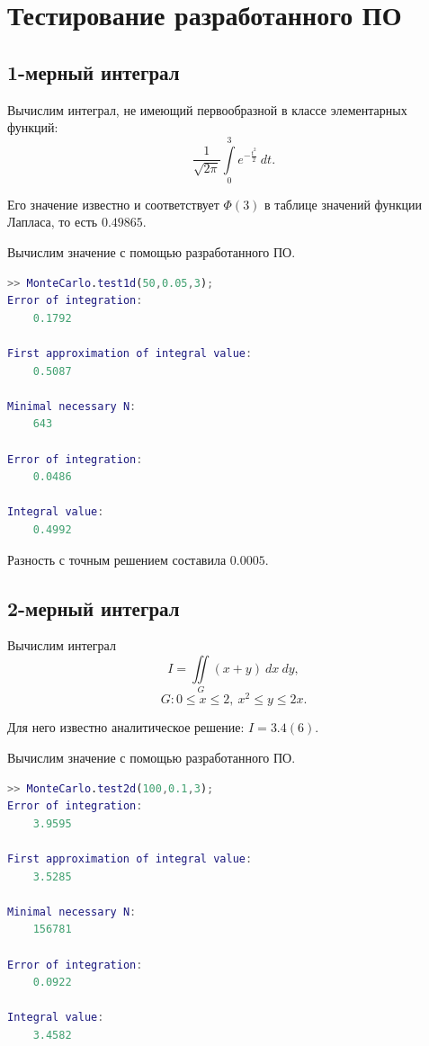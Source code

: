 \documentclass[a4paper,12pt]{article}
\begin{document}
\newpage
\section{Тестирование разработанного ПО}

\subsection{1-мерный интеграл}

Вычислим интеграл, не имеющий первообразной в классе элементарных функций:
\begin{equation}
	\frac{1}{\sqrt{2\pi}} \int\limits_{0}^{3} e^{-\frac{t^2}{2}}\:dt.
\end{equation}

Его значение известно и соответствует $\Phi(3)$ в таблице значений функции Лапласа, то есть $0.49865$.

Вычислим значение с помощью разработанного ПО.

\begin{lstlisting}[language=MATLAB]
>> MonteCarlo.test1d(50,0.05,3);
Error of integration:
    0.1792

First approximation of integral value:
    0.5087

Minimal necessary N:
    643

Error of integration:
    0.0486

Integral value:
    0.4992
\end{lstlisting}

Разность с точным решением составила $0.0005$.


\newpage
\subsection{2-мерный интеграл}

Вычислим интеграл
\begin{equation}
	I = \iint\limits_G (x+y)\:dx\:dy,
\end{equation}
\[
	G: 0 \leq x \leq 2,\:
	 x^2 \leq y \leq 2x.
\]

Для него известно аналитическое решение: $I = 3.4(6)$.

Вычислим значение с помощью разработанного ПО.

\begin{lstlisting}[language=MATLAB]
>> MonteCarlo.test2d(100,0.1,3);
Error of integration:
    3.9595

First approximation of integral value:
    3.5285

Minimal necessary N:
    156781

Error of integration:
    0.0922

Integral value:
    3.4582
\end{lstlisting}
\end{document}
